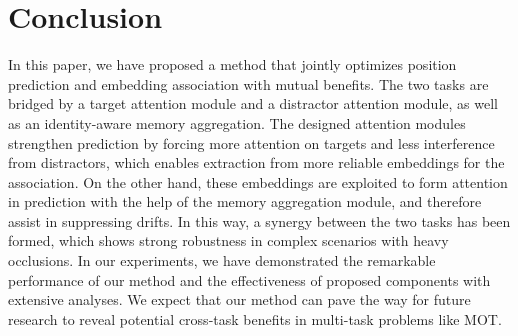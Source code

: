 \documentclass[final]{cvpr}
\begin{document}


\section{Conclusion}
In this paper, we have proposed a method that jointly optimizes position prediction and embedding association with mutual benefits.
The two tasks are bridged by a target attention module and a distractor attention module, as well as an identity-aware memory aggregation.
The designed attention modules strengthen prediction by forcing more attention on targets and less interference from distractors, which enables extraction from more reliable embeddings for the association. On the other hand, these embeddings are exploited to form attention in prediction with the help of the memory aggregation module, and therefore assist in suppressing drifts. In this way, a synergy between the two tasks has been formed, which shows strong robustness in complex scenarios with heavy occlusions.
In our experiments, we have demonstrated the remarkable performance of our method and the effectiveness of proposed components with extensive analyses. We expect that our method can pave the way for future research to reveal potential cross-task benefits in multi-task problems like MOT.

\end{document}
